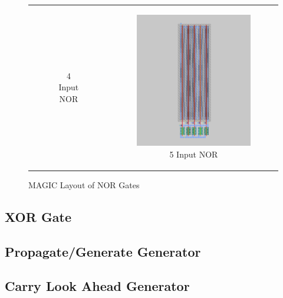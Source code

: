 \documentclass[conference]{IEEEtran}
\begin{document}
\begin{figure}[H]
\begin{tabular}{cc}
\begin{subfigure}{0.44\linewidth}
            \caption{4 Input NOR}
        \end{subfigure} &
        \begin{subfigure}{0.44\linewidth}
            \centering
            \includegraphics[width=\textwidth]{images/nor_5_cmos_layout.png}
            \caption{5 Input NOR}
        \end{subfigure}
    \end{tabular}
    \caption{MAGIC Layout of NOR Gates}
\end{figure}

\subsection{XOR Gate}

\subsection{Propagate/Generate Generator}

\subsection{Carry Look Ahead Generator}
\end{document}
